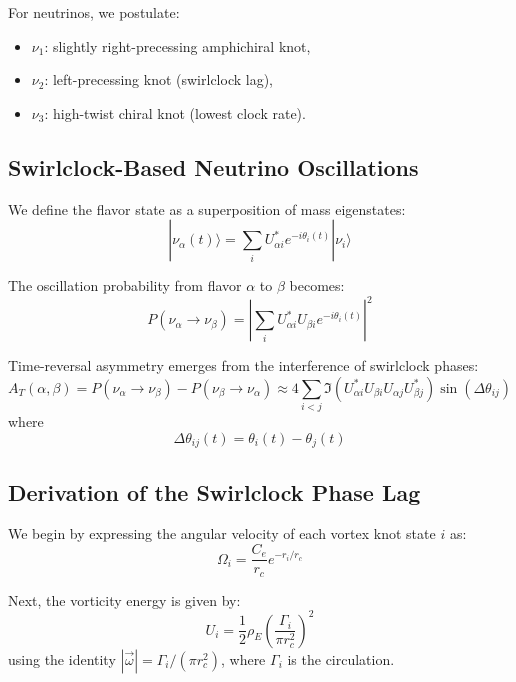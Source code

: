 For neutrinos, we postulate:
\begin{itemize}
\item \( \nu_1 \): slightly right-precessing amphichiral knot,
\item \( \nu_2 \): left-precessing knot (swirlclock lag),
\item \( \nu_3 \): high-twist chiral knot (lowest clock rate).
\end{itemize}

\subsection{Swirlclock-Based Neutrino Oscillations}

We define the flavor state as a superposition of mass eigenstates:
\begin{equation}
|\nu_\alpha(t)\rangle = \sum_i U_{\alpha i}^* e^{-i\theta_i(t)} |\nu_i\rangle
\end{equation}

The oscillation probability from flavor \( \alpha \) to \( \beta \) becomes:
\begin{equation}
P(\nu_\alpha \rightarrow \nu_\beta) = \left| \sum_i U_{\alpha i}^* U_{\beta i} e^{-i\theta_i(t)} \right|^2
\end{equation}

Time-reversal asymmetry emerges from the interference of swirlclock phases:
\begin{equation}
A_T(\alpha, \beta) = P(\nu_\alpha \rightarrow \nu_\beta) - P(\nu_\beta \rightarrow \nu_\alpha) \approx 4 \sum_{i<j} \Im(U_{\alpha i}^* U_{\beta i} U_{\alpha j} U_{\beta j}^*) \sin(\Delta \theta_{ij})
\end{equation}
where
\begin{equation}
\Delta \theta_{ij}(t) = \theta_i(t) - \theta_j(t)
\end{equation}

\subsection{Derivation of the Swirlclock Phase Lag}

We begin by expressing the angular velocity of each vortex knot state \( i \) as:
\begin{equation}
\Omega_i = \frac{C_e}{r_c} e^{-r_i / r_c}
\end{equation}

Next, the vorticity energy is given by:
\begin{equation}
U_i = \frac{1}{2} \rho_{\scriptscriptstyle\boldsymbol\!E}\left( \frac{\Gamma_i}{\pi r_c^2} \right)^2
\end{equation}
using the identity \( |\vec{\omega}| = \Gamma_i / (\pi r_c^2) \), where \( \Gamma_i \) is the circulation.

